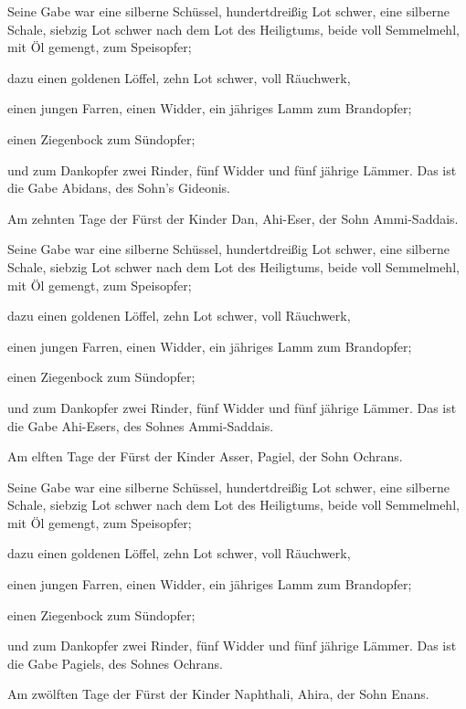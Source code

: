  Seine Gabe war eine silberne Schüssel, hundertdreißig Lot
schwer, eine silberne Schale, siebzig Lot schwer nach dem Lot des
Heiligtums, beide voll Semmelmehl, mit Öl gemengt, zum Speisopfer;

 dazu einen goldenen Löffel, zehn Lot schwer, voll
Räuchwerk,

 einen jungen Farren, einen Widder, ein jähriges Lamm zum
Brandopfer;

 einen Ziegenbock zum Sündopfer;

 und zum Dankopfer zwei Rinder, fünf Widder und fünf
jährige Lämmer. Das ist die Gabe Abidans, des Sohn's Gideonis.

 Am zehnten Tage der Fürst der Kinder Dan, Ahi-Eser, der
Sohn Ammi-Saddais.

 Seine Gabe war eine silberne Schüssel, hundertdreißig Lot
schwer, eine silberne Schale, siebzig Lot schwer nach dem Lot des
Heiligtums, beide voll Semmelmehl, mit Öl gemengt, zum Speisopfer;

 dazu einen goldenen Löffel, zehn Lot schwer, voll
Räuchwerk,

 einen jungen Farren, einen Widder, ein jähriges Lamm zum
Brandopfer;

 einen Ziegenbock zum Sündopfer;

 und zum Dankopfer zwei Rinder, fünf Widder und fünf
jährige Lämmer. Das ist die Gabe Ahi-Esers, des Sohnes Ammi-Saddais.

 Am elften Tage der Fürst der Kinder Asser, Pagiel, der
Sohn Ochrans.

 Seine Gabe war eine silberne Schüssel, hundertdreißig Lot
schwer, eine silberne Schale, siebzig Lot schwer nach dem Lot des
Heiligtums, beide voll Semmelmehl, mit Öl gemengt, zum Speisopfer;

 dazu einen goldenen Löffel, zehn Lot schwer, voll
Räuchwerk,

 einen jungen Farren, einen Widder, ein jähriges Lamm zum
Brandopfer;

 einen Ziegenbock zum Sündopfer;

 und zum Dankopfer zwei Rinder, fünf Widder und fünf
jährige Lämmer. Das ist die Gabe Pagiels, des Sohnes Ochrans.

 Am zwölften Tage der Fürst der Kinder Naphthali, Ahira,
der Sohn Enans.

